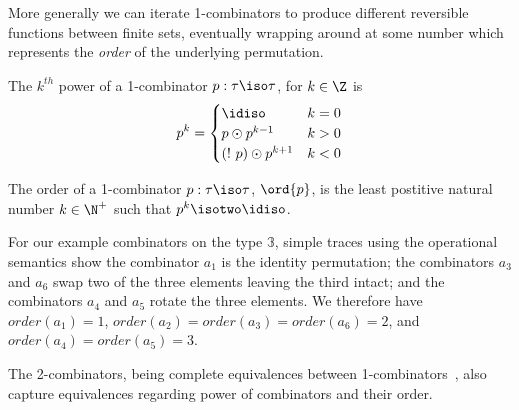 More generally we can iterate 1-combinators to produce different
reversible functions between finite sets, eventually wrapping around
at some number which represents the \emph{order} of the underlying
permutation.

\begin{definition}
  The $k^{th}$ power of a 1-combinator $p : \tau \iso \tau$, for
  $k \in \Z$ is
  \[
    p^k =
  \begin{cases}
    \idiso & k = 0 \\
    p \odot p^{k - 1} & k > 0 \\
    (!~p) \odot p^{k + 1} & k < 0 \\
  \end{cases}
  \]
\end{definition}

\begin{definition}
  The order of a 1-combinator $p : \tau \iso \tau$, $\ord{p}$, is the
  least postitive natural number $k \in \N^+$ such that
  $p^k \isotwo \idiso$.
\end{definition}

For our example combinators on the type $\mathbb{3}$, simple traces
using the operational semantics show the combinator $a_1$ is the
identity permutation; the combinators $a_3$ and $a_6$ swap two of the
three elements leaving the third intact; and the combinators $a_4$ and
$a_5$ rotate the three elements. We therefore have
$\mathit{order}(a_1)=1$,
$\mathit{order}(a_2)=\mathit{order}(a_3)=\mathit{order}(a_6)=2$, and
$\mathit{order}(a_4)=\mathit{order}(a_5)=3$.



The 2-combinators, being complete equivalences between
1-combinators~\cite{Carette2016}, also capture equivalences regarding
power of combinators and their order.

